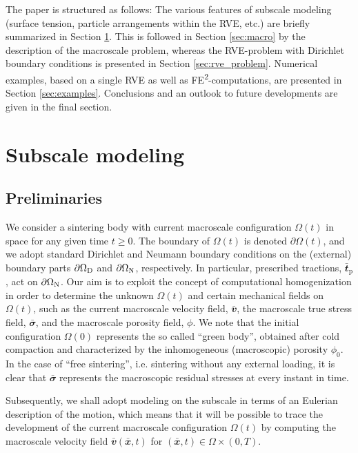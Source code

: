 \documentclass[12pt,a4paper,fleqn]{article}
\renewcommand{\ta}[1]{\mathbfit{#1}}
\renewcommand{\ts}[1]{\mathbfit{#1}}
\newcommand{\figref}[1]{Figure~\ref{#1}}
\newcommand{\pore}{\mathrm{pore}}
\newcommand{\particle}{\mathrm{part}}
\newcommand{\prescribed}{\mathrm{p}}
\newcommand{\contact}{\mathrm{cont}}
\begin{document}
The paper is structured as follows:
The various features of subscale modeling (surface tension, particle arrangements within the RVE, etc.) are briefly summarized in Section \ref{sec:subscale}. This is followed in Section \ref{sec:macro} by the description of the macroscale problem, whereas the RVE-problem with Dirichlet boundary conditions is presented in Section \ref{sec:rve_problem}. Numerical examples, based on a single RVE as well as FE\textsuperscript{2}-computations, are presented in Section \ref{sec:examples}. Conclusions and an outlook to future developments are given in the final section.


\section{Subscale modeling}\label{sec:subscale}

\subsection{Preliminaries}

We consider a sintering body with current macroscale configuration $\Omega(t)$ in space for any given time $t\geq 0$. The boundary of $\Omega(t)$ is denoted $\partial\Omega(t)$, and we adopt standard Dirichlet and Neumann boundary conditions on the (external) boundary parts $\partial\Omega_{\mathrm{D}}$ and $\partial\Omega_{\mathrm{N}}$, respectively. In particular, prescribed tractions, $\bar{\ta t}_\prescribed$, act on $\partial\Omega_{\mathrm{N}}$.  Our aim is to exploit the concept of computational homogenization in order to determine the unknown $\Omega(t)$ and certain mechanical fields on $\Omega(t)$, such as the current macroscale velocity field, $\bar{\ts v}$, the macroscale true stress field, $\bar{\ts\sigma}$, and the macroscale porosity field, $\phi$. We note that the initial configuration $\Omega(0)$ represents the so called ``green body'', obtained after cold compaction and characterized by the inhomogeneous (macroscopic) porosity $\phi_0$. In the case of ``free sintering'', i.e. sintering without any external loading, it is clear that $\bar{\ts\sigma}$ represents the macroscopic residual stresses at every instant in time.

Subsequently, we shall adopt modeling on the subscale in terms of an Eulerian description of the motion, which means that it will be possible to trace the development of the current macroscale configuration $\Omega(t)$ by computing the macroscale velocity field $\bar{\ta v}(\bar{\ta x},t)$ for $(\bar{\ta x},t)\in\Omega\times(0,T)$.
\end{document}
